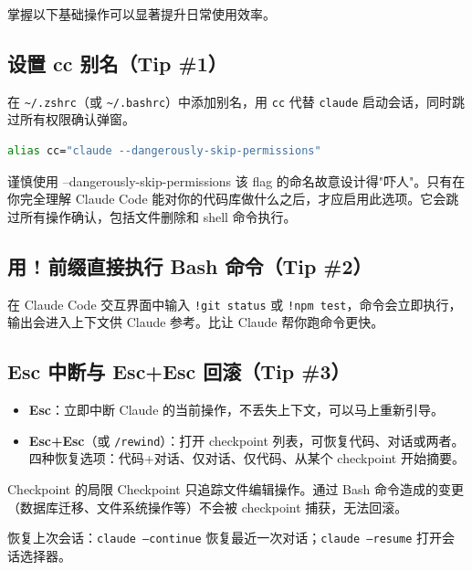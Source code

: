 \documentclass[a4paper]{article}
\begin{document}
掌握以下基础操作可以显著提升日常使用效率。

\subsection{设置 cc 别名（Tip \#1）}

在 \texttt{\textasciitilde/.zshrc}（或 \texttt{\textasciitilde/.bashrc}）中添加别名，用 \texttt{cc} 代替 \texttt{claude} 启动会话，同时跳过所有权限确认弹窗。

\begin{lstlisting}[caption={cc 别名配置}, language=bash]
alias cc="claude --dangerously-skip-permissions"
\end{lstlisting}

\begin{warningbox}{谨慎使用 --dangerously-skip-permissions}
该 flag 的命名故意设计得"吓人"。只有在你完全理解 Claude Code 能对你的代码库做什么之后，才应启用此选项。它会跳过所有操作确认，包括文件删除和 shell 命令执行。
\end{warningbox}

\subsection{用 ! 前缀直接执行 Bash 命令（Tip \#2）}

在 Claude Code 交互界面中输入 \texttt{!git status} 或 \texttt{!npm test}，命令会立即执行，输出会进入上下文供 Claude 参考。比让 Claude 帮你跑命令更快。

\subsection{Esc 中断与 Esc+Esc 回滚（Tip \#3）}

\begin{itemize}
  \item \textbf{Esc}：立即中断 Claude 的当前操作，不丢失上下文，可以马上重新引导。
  \item \textbf{Esc+Esc}（或 \texttt{/rewind}）：打开 checkpoint 列表，可恢复代码、对话或两者。四种恢复选项：代码+对话、仅对话、仅代码、从某个 checkpoint 开始摘要。
\end{itemize}

\begin{importantbox}{Checkpoint 的局限}
Checkpoint 只追踪文件编辑操作。通过 Bash 命令造成的变更（数据库迁移、文件系统操作等）不会被 checkpoint 捕获，无法回滚。
\end{importantbox}

恢复上次会话：\texttt{claude --continue} 恢复最近一次对话；\texttt{claude --resume} 打开会话选择器。
\end{document}
